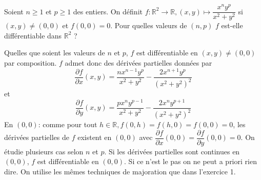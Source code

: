 \documentclass{fancybook}
\begin{document}
\begin{exercice}
Soient $n\geq 1$ et $p\geq 1$ des entiers. \newline On définit $\displaystyle f:\mathbb R^2\to \mathbb R, (x,y)\mapsto \dfrac{x^ny^p}{x^2+y^2}$ si $(x,y)\neq (0,0)$ et $f(0,0)=0$. \newline
Pour quelles valeurs de $(n,p)$ $f$ est-elle différentiable dans $\mathbb R^2$ ?
\end{exercice}
Quelles que soient les valeurs de $n$ et $p$, $f$ est différentiable en $(x,y)\neq (0,0)$ par composition. $f$ admet donc des dérivées partielles données par $$\dfrac{\partial f}{\partial x}(x,y) = \dfrac{n x^{n-1} y^p}{x^2+y^2}-\dfrac{2 x^{n+1} y^p}{\left(x^2+y^2\right)^2}$$ et $$\dfrac{\partial f}{\partial y}(x,y)=\dfrac{p x^n y^{p-1}}{x^2+y^2}-\dfrac{2 x^n y^{p+1}}{\left(x^2+y^2\right)^2}$$ \newline
En $(0,0)$: comme pour tout $h\in \mathbb R, f(0,h)=f(h,0)=f(0,0)=0$, les dérivées partielles de $f$ existent en $(0,0)$ avec $\dfrac{\partial f}{\partial x}(0,0)=\dfrac{\partial f}{\partial y}(0,0)=0$.\newline \newline 
On étudie plusieurs cas selon $n$ et $p$. Si les dérivées partielles sont continues en $(0,0)$, $f$ est différentiable en $(0,0)$. Si ce n'est le pas on ne peut a priori rien dire.\newline
On utilise les mêmes techniques de majoration que dans l'exercice 1.
\end{document}
